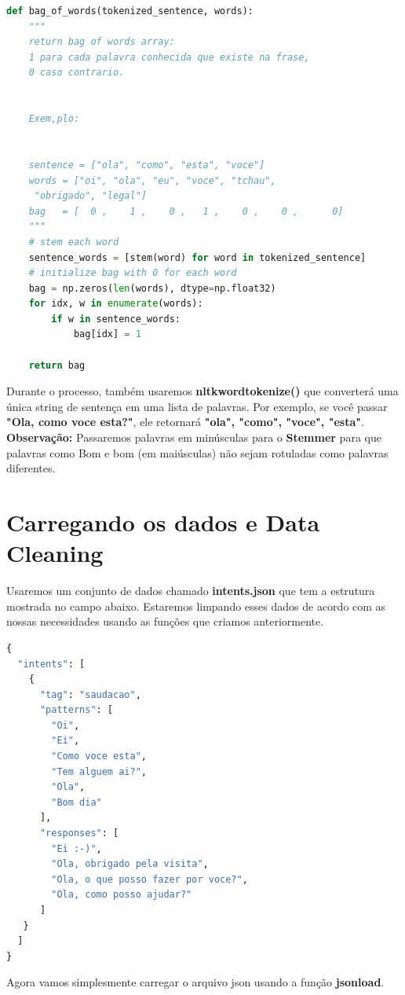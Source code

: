 \begin{lstlisting}[language=Python, caption=Python Bag of Words]
def bag_of_words(tokenized_sentence, words):
    """
    return bag of words array:
    1 para cada palavra conhecida que existe na frase,
    0 caso contrario.


    Exem,plo:


    sentence = ["ola", "como", "esta", "voce"]
    words = ["oi", "ola", "eu", "voce", "tchau",
     "obrigado", "legal"]
    bag   = [  0 ,    1 ,    0 ,   1 ,    0 ,    0 ,      0]
    """
    # stem each word
    sentence_words = [stem(word) for word in tokenized_sentence]
    # initialize bag with 0 for each word
    bag = np.zeros(len(words), dtype=np.float32)
    for idx, w in enumerate(words):
        if w in sentence_words:
            bag[idx] = 1

    return bag

\end{lstlisting}

Durante o processo, também usaremos \textbf{nltkwordtokenize()} que converterá uma única string de sentença em uma lista de palavras. Por exemplo, se você passar \textbf{"Ola, como voce esta?"}, ele retornará \textbf{"ola", "como", "voce", "esta"}.
\textbf{Observação:} Passaremos palavras em minúsculas para o \textbf{Stemmer} para que palavras como Bom e bom (em maiúsculas) não sejam rotuladas como palavras diferentes.

\section[Carregando os dados e Data Cleaning]{Carregando os dados e Data Cleaning}
Usaremos um conjunto de dados chamado  \textbf{intents.json} que tem a estrutura mostrada no campo abaixo. Estaremos limpando esses dados de acordo com as nossas necessidades usando as funções que criamos anteriormente.

\begin{lstlisting}[language=python, caption=Data intents.json]
{
  "intents": [
    {
      "tag": "saudacao",
      "patterns": [
        "Oi",
        "Ei",
        "Como voce esta",
        "Tem alguem ai?",
        "Ola",
        "Bom dia"
      ],
      "responses": [
        "Ei :-)",
        "Ola, obrigado pela visita",
        "Ola, o que posso fazer por voce?",
        "Ola, como posso ajudar?"
      ]
   }
  ]
}


\end{lstlisting}
Agora vamos simplesmente carregar o arquivo json usando a função \textbf{jsonload}.

